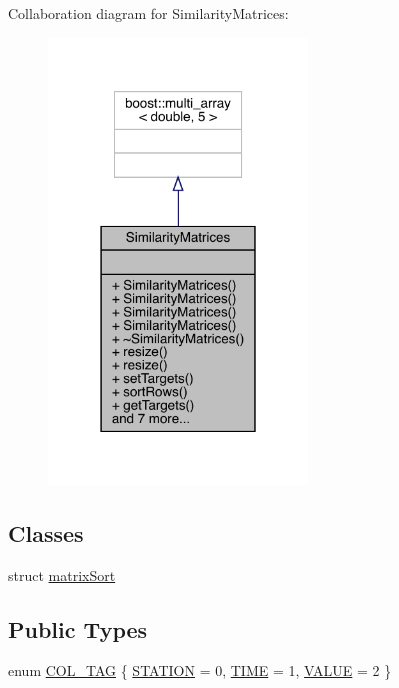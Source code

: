 Collaboration diagram for Similarity\+Matrices\+:
\nopagebreak
\begin{figure}[H]
\begin{center}
\leavevmode
\includegraphics[width=195pt]{class_similarity_matrices__coll__graph}
\end{center}
\end{figure}
\subsection*{Classes}
\begin{DoxyCompactItemize}
\item 
struct \mbox{\hyperlink{struct_similarity_matrices_1_1matrix_sort}{matrix\+Sort}}
\end{DoxyCompactItemize}
\subsection*{Public Types}
\begin{DoxyCompactItemize}
\item 
enum \mbox{\hyperlink{class_similarity_matrices_a8fea56a2e7c8a9f692753c8f706e5706}{C\+O\+L\+\_\+\+T\+AG}} \{ \mbox{\hyperlink{class_similarity_matrices_a8fea56a2e7c8a9f692753c8f706e5706a8ba7466b31b69981ceb195d189011e9e}{S\+T\+A\+T\+I\+ON}} = 0, 
\mbox{\hyperlink{class_similarity_matrices_a8fea56a2e7c8a9f692753c8f706e5706a9b189567e1ffaab24025f18b48102d5c}{T\+I\+ME}} = 1, 
\mbox{\hyperlink{class_similarity_matrices_a8fea56a2e7c8a9f692753c8f706e5706a7e2e95a0186387323e96d06c26d90280}{V\+A\+L\+UE}} = 2
 \}
\end{DoxyCompactItemize}
